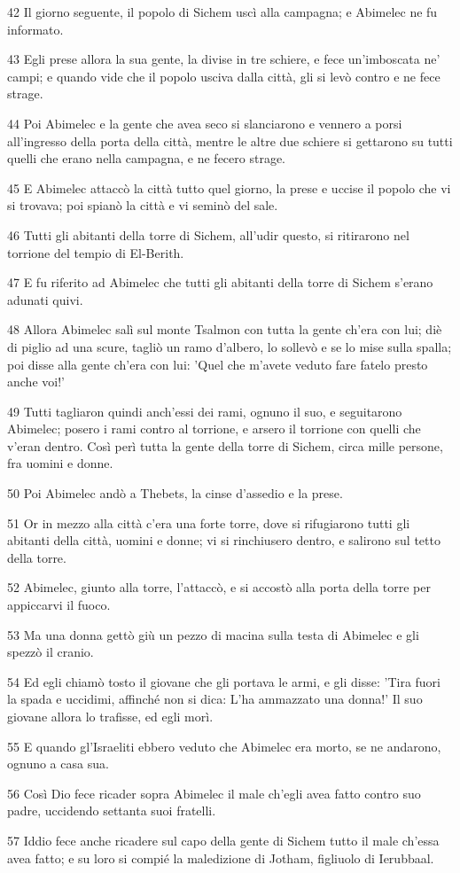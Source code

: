 \par 42 Il giorno seguente, il popolo di Sichem uscì alla campagna; e Abimelec ne fu informato.
\par 43 Egli prese allora la sua gente, la divise in tre schiere, e fece un'imboscata ne' campi; e quando vide che il popolo usciva dalla città, gli si levò contro e ne fece strage.
\par 44 Poi Abimelec e la gente che avea seco si slanciarono e vennero a porsi all'ingresso della porta della città, mentre le altre due schiere si gettarono su tutti quelli che erano nella campagna, e ne fecero strage.
\par 45 E Abimelec attaccò la città tutto quel giorno, la prese e uccise il popolo che vi si trovava; poi spianò la città e vi seminò del sale.
\par 46 Tutti gli abitanti della torre di Sichem, all'udir questo, si ritirarono nel torrione del tempio di El-Berith.
\par 47 E fu riferito ad Abimelec che tutti gli abitanti della torre di Sichem s'erano adunati quivi.
\par 48 Allora Abimelec salì sul monte Tsalmon con tutta la gente ch'era con lui; diè di piglio ad una scure, tagliò un ramo d'albero, lo sollevò e se lo mise sulla spalla; poi disse alla gente ch'era con lui: 'Quel che m'avete veduto fare fatelo presto anche voi!'
\par 49 Tutti tagliaron quindi anch'essi dei rami, ognuno il suo, e seguitarono Abimelec; posero i rami contro al torrione, e arsero il torrione con quelli che v'eran dentro. Così perì tutta la gente della torre di Sichem, circa mille persone, fra uomini e donne.
\par 50 Poi Abimelec andò a Thebets, la cinse d'assedio e la prese.
\par 51 Or in mezzo alla città c'era una forte torre, dove si rifugiarono tutti gli abitanti della città, uomini e donne; vi si rinchiusero dentro, e salirono sul tetto della torre.
\par 52 Abimelec, giunto alla torre, l'attaccò, e si accostò alla porta della torre per appiccarvi il fuoco.
\par 53 Ma una donna gettò giù un pezzo di macina sulla testa di Abimelec e gli spezzò il cranio.
\par 54 Ed egli chiamò tosto il giovane che gli portava le armi, e gli disse: 'Tira fuori la spada e uccidimi, affinché non si dica: L'ha ammazzato una donna!' Il suo giovane allora lo trafisse, ed egli morì.
\par 55 E quando gl'Israeliti ebbero veduto che Abimelec era morto, se ne andarono, ognuno a casa sua.
\par 56 Così Dio fece ricader sopra Abimelec il male ch'egli avea fatto contro suo padre, uccidendo settanta suoi fratelli.
\par 57 Iddio fece anche ricadere sul capo della gente di Sichem tutto il male ch'essa avea fatto; e su loro si compié la maledizione di Jotham, figliuolo di Ierubbaal.

